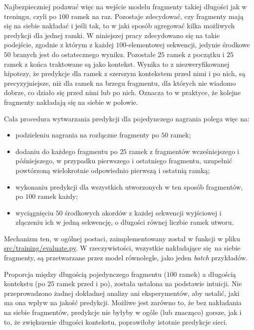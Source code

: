 Najbezpieczniej podawać więc na wejście modelu fragmenty takiej długości jak w treningu, czyli po $100$ ramek na raz. Pozostaje zdecydować, czy fragmenty mają się na siebie nakładać i jeśli tak, to w jaki sposób agregować kilka możliwych predykcji dla jednej ramki. W niniejszej pracy zdecydowano się na takie podejście, zgodnie z którym z każdej $100$-elementowej sekwencji, jedynie środkowe $50$ branych jest do ostatecznego wyniku. Pozostałe $25$ ramek z początku i $25$ ramek z końca traktowane są jako kontekst. Wynika to z niezweryfikowanej hipotezy, że predykcje dla ramek z szerszym kontekstem przed nimi i po nich, są precyzyjniejsze, niż dla ramek na brzegu fragmentu, dla których nie wiadomo dobrze, co działo się przed nimi lub po nich. Oznacza to w praktyce, że kolejne fragmenty nakładają się na siebie w połowie. 

Cała procedura wytwarzania predykcji dla pojedynczego nagrania polega więc na:
\begin{itemize}
    \item podzieleniu nagrania na rozłączne fragmenty po $50$ ramek;
    \item dodaniu do każdego fragmentu po $25$ ramek z fragmentów wcześniejszego i późniejszego, w
        przypadku pierwszego i ostatniego fragmentu, uzupełnić powtórzoną wielokrotnie odpowiednio
        pierwszą i ostatnią ramką;
    \item wykonaniu predykcji dla wszystkich utworzonych w ten sposób fragmentów, po $100$ ramek
        każdy;
    \item wyciągnięciu $50$ środkowych akordów z każdej sekwencji wyjściowej i złączeniu ich w jedną
        sekwencję, o długości równej liczbie ramek utworu.
\end{itemize}
Mechanizm ten, w ogólnej postaci, zaimplementowany został w funkcji  w pliku \url{src/training/evaluate.py}. W rzeczywistości, wszystkie nakładające się na siebie fragmenty, są przetwarzane przez model równolegle, jako jeden \emph{batch} przykładów.

Proporcja między długością pojedynczego fragmentu ($100$ ramek) a długością kontekstu (po $25$ ramek przed i po), została ustalona na podstawie intuicji. Nie przeprowadzono żadnej dokładnej analizy ani eksperymentów, aby ustalić, jaki ma ona wpływ na jakość predykcji. Możliwe jest zarówno to, że bez nakładania na siebie fragmentów, predykcje nie byłyby w ogóle (lub znacząco) gorsze, jak i to, że zwiększenie długości kontekstu, poprawiłoby istotnie predykcje sieci.



